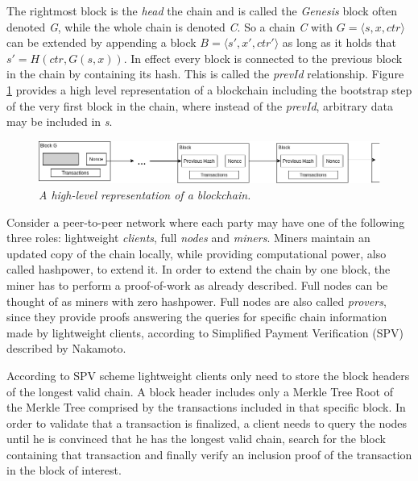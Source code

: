 \documentclass[11pt,a4paper]{article}
\begin{document}
The rightmost block is the \textit{head} the chain and is called the \textit{Genesis} block often
denoted \textit{G}, while the whole chain is denoted \textit{C}. So a chain \textit{C} with
$G = \langle s, x, ctr \rangle$ can be extended by appending a block $B = \langle s', x', ctr'
\rangle$ as long as it holds that $s' = H(ctr, G(s,x))$. In effect every block is connected to the
previous block in the chain by containing its hash. This is called the \textit{prevId} relationship.
Figure \ref{fig:abstract_chain} provides a high level representation of a blockchain including the
bootstrap step of the very first block in the chain, where instead of the \textit{prevId},
arbitrary data may be included in \textit{s}.

\begin{figure}[h!]
	\begin{center}
		\includegraphics[scale=0.49]{figures/abstract_chain_bootstrap.png}
	\end{center}
	\caption{\textit{A high-level representation of a blockchain. }}
	\label{fig:abstract_chain}
\end{figure}


Consider a peer-to-peer network where each party may have one of the following three roles:
lightweight \textit{clients}, full \textit{nodes} and \textit{miners}.
Miners maintain an updated copy of the chain locally, while providing computational power, also
called hashpower, to extend it. In order to extend the chain by one block, the miner has to perform
a proof-of-work as already described.
Full nodes can be thought of as miners with zero hashpower. Full nodes are also called
\textit{provers}, since they provide proofs  answering the queries for specific chain information
made by lightweight clients, according to Simplified Payment Verification (SPV) described by
Nakamoto\cite{Nakamoto}.

According to SPV scheme lightweight clients only need to store the block headers of the longest
valid chain. A block header includes only a Merkle Tree Root of the Merkle Tree comprised by
the transactions included in that specific block. In order to validate that a transaction is
finalized, a client needs to query the nodes until he is convinced that he has the longest
valid chain, search for the block containing that transaction and finally verify an inclusion
proof of the transaction in the block of interest.
\end{document}
